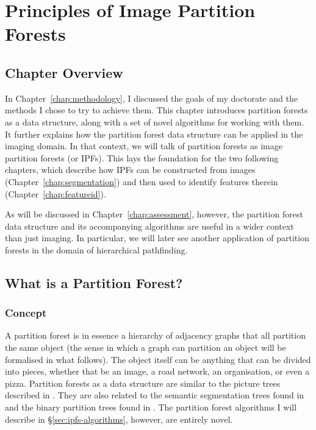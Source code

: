 \chapter{Principles of Image Partition Forests}
\label{chap:ipfs}

\section{Chapter Overview}

In Chapter~\ref{chap:methodology}, I discussed the goals of my doctorate and the methods I chose to try to achieve them. This chapter introduces partition forests as a data structure, along with a set of novel algorithms for working with them. It further explains how the partition forest data structure can be applied in the imaging domain. In that context, we will talk of partition forests as image partition forests (or IPFs). This lays the foundation for the two following chapters, which describe how IPFs can be constructed from images (Chapter~\ref{chap:segmentation}) and then used to identify features therein (Chapter~\ref{chap:featureid}).

As will be discussed in Chapter~\ref{chap:assessment}, however, the partition forest data structure and its accompanying algorithms are useful in a wider context than just imaging. In particular, we will later see another application of partition forests in the domain of hierarchical pathfinding.

\section{What is a Partition Forest?}

\subsection{Concept}

A partition forest is in essence a hierarchy of adjacency graphs that all partition the same object (the sense in which a graph can partition an object will be formalised in what follows). The object itself can be anything that can be divided into pieces, whether that be an image, a road network, an organisation, or even a pizza. Partition forests as a data structure are similar to the picture trees described in \cite{andrade03}. They are also related to the semantic segmentation trees found in \cite{al-haj08} and the binary partition trees found in \cite{salembier00}. The partition forest algorithms I will describe in \S\ref{sec:ipfs-algorithms}, however, are entirely novel.

